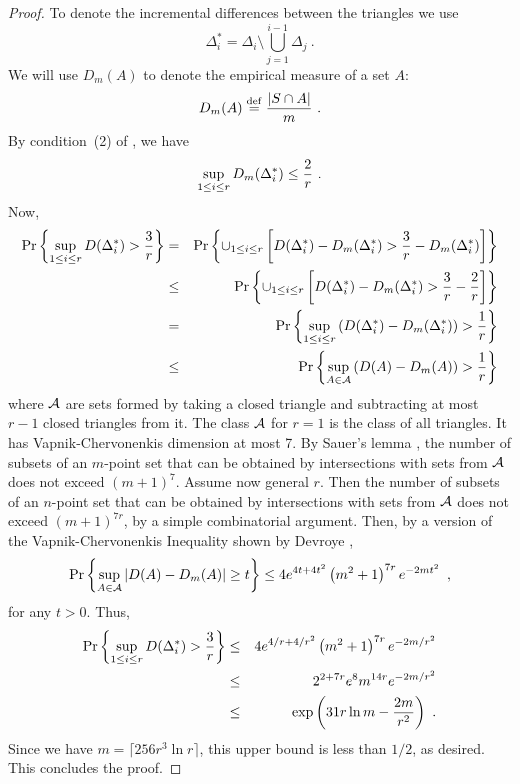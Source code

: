\documentclass{patmorin}
\begin{document}
\begin{proof}
To denote the incremental differences between the triangles we use
\[
  \Delta_i^* = \Delta_i \setminus \bigcup_{j=1}^{i-1} \Delta_j ~.
\]
We will
use $D_m(A)$ to denote the empirical measure of a set $A$:
\[
  D_m (A) \isdef {{|S\cap A|} \over m}
~.
\]  
By condition~(2) of ,
we have
\[
  \sup_{1 \le i \le r} D_m(\Delta_i^*) \le { 2 \over r }~.
\]
Now,
\begin{eqnarray*}
\Pr \left\{ \sup_{1 \le i \le r} D ( \Delta^*_i ) > {3 \over r} \right\}
&=& \Pr \left\{ \cup_{1 \le i \le r} \left[ D ( \Delta^*_i ) - D_m(\Delta_i^*)  >  {3 \over r} - D_m(\Delta_i^*) \right] \right\} \cr
&\le& \Pr \left\{ \cup_{1 \le i \le r} \left[ D ( \Delta^*_i ) - D_m(\Delta_i^*)  > {3 \over r} - {2 \over r}  \right] \right\} \cr
&=& \Pr \left\{ \sup_{1 \le i \le r} \left(  D ( \Delta^*_i ) - D_m(\Delta_i^*) \right) > {1 \over r} \right\} \cr
&\le& \Pr \left\{ \sup_{A \in {\cal A}} \left( D ( A ) - D_m ( A ) \right)  > {1 \over r} \right\} \cr
\end{eqnarray*}
where $\cal A$ are sets formed by taking a closed triangle and subtracting
at most $r-1$  closed triangles from it.
The class $\cal A$ for $r=1$ is the class of all triangles.
It has Vapnik-Chervonenkis dimension at most 7. 
By Sauer's  lemma 
\cite{s72}\cite[Pages~28--29]{dl01},
the number of subsets of an $m$-point set that can be obtained by intersections
with sets from $\cal A$ does not exceed $(m+1)^7$.
Assume now general $r$. Then the number of subsets of an $n$-point set that can be obtained by intersections
with sets from $\cal A$ does not exceed $(m+1)^{7r}$,
by a simple combinatorial argument.
Then, by a version of the Vapnik-Chervonenkis Inequality 
\cite{vc71} shown by Devroye \cite{d82},
\[
\Pr \left\{ \sup_{A \in {\cal A}} \left| D ( A ) - D_m ( A ) \right|  \ge t \right\}
\le 4 e^{4t+4t^2} \left( m^2 + 1 \right)^{7r}  e^{-2mt^2} \enspace , 
\]
for any $t > 0$.  Thus, 
\begin{eqnarray*}
\Pr \left\{ \sup_{1 \le i \le r} D ( \Delta^*_i )  > {3 \over r} \right\}
&\le& 4 e^{4/r + 4/r^2} \left( m^2 + 1 \right)^{7r}  e^{-2m/r^2} \\
&\le& 2^{2+7r}  e^{8}  m^{14r}  e^{-2m/r^2} \\
&\le& \exp \left( 31r\ln m - \frac{2m}{r^2} \right)  ~.
\end{eqnarray*}
Since we have $m=\lceil 256r^3\ln r \rceil$, this upper bound is less than $1/2$, as desired.  This concludes the proof.
\end{proof}
\end{document}
